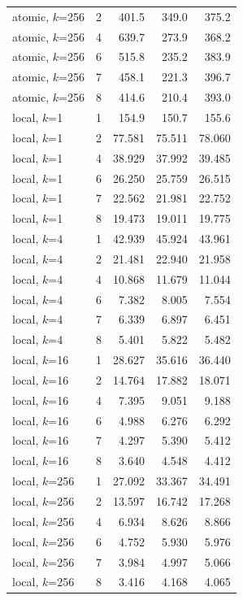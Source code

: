 {\begin{longtable}{llrrr}
atomic, $k$=256 & 2 & 401.5 & 349.0 & 375.2 \\
atomic, $k$=256 & 4 & 639.7 & 273.9 & 368.2 \\
atomic, $k$=256 & 6 & 515.8 & 235.2 & 383.9 \\
atomic, $k$=256 & 7 & 458.1 & 221.3 & 396.7 \\
atomic, $k$=256 & 8 & 414.6 & 210.4 & 393.0 \\
\midrule
local, $k$=1 & 1 & 154.9 & 150.7 & 155.6 \\
local, $k$=1 & 2 & 77.581 & 75.511 & 78.060 \\
local, $k$=1 & 4 & 38.929 & 37.992 & 39.485 \\
local, $k$=1 & 6 & 26.250 & 25.759 & 26.515 \\
local, $k$=1 & 7 & 22.562 & 21.981 & 22.752 \\
local, $k$=1 & 8 & 19.473 & 19.011 & 19.775 \\
\midrule
local, $k$=4 & 1 & 42.939 & 45.924 & 43.961 \\
local, $k$=4 & 2 & 21.481 & 22.940 & 21.958 \\
local, $k$=4 & 4 & 10.868 & 11.679 & 11.044 \\
local, $k$=4 & 6 & 7.382 & 8.005 & 7.554 \\
local, $k$=4 & 7 & 6.339 & 6.897 & 6.451 \\
local, $k$=4 & 8 & 5.401 & 5.822 & 5.482 \\
\midrule
local, $k$=16 & 1 & 28.627 & 35.616 & 36.440 \\
local, $k$=16 & 2 & 14.764 & 17.882 & 18.071 \\
local, $k$=16 & 4 & 7.395 & 9.051 & 9.188 \\
local, $k$=16 & 6 & 4.988 & 6.276 & 6.292 \\
local, $k$=16 & 7 & 4.297 & 5.390 & 5.412 \\
local, $k$=16 & 8 & 3.640 & 4.548 & 4.412 \\
\midrule
local, $k$=256 & 1 & 27.092 & 33.367 & 34.491 \\
local, $k$=256 & 2 & 13.597 & 16.742 & 17.268 \\
local, $k$=256 & 4 & 6.934 & 8.626 & 8.866 \\
local, $k$=256 & 6 & 4.752 & 5.930 & 5.976 \\
local, $k$=256 & 7 & 3.984 & 4.997 & 5.066 \\
local, $k$=256 & 8 & 3.416 & 4.168 & 4.065 \\
\end{longtable}
}
